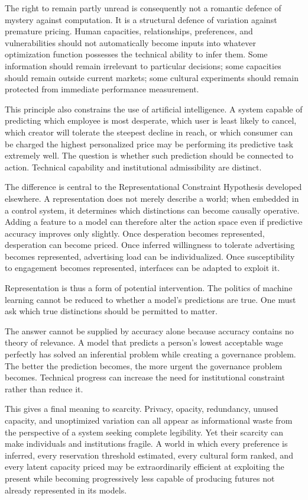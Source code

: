 \documentclass[11pt]{article}
\begin{document}
The right to remain partly unread is consequently not a romantic defence of mystery against computation. It is a structural defence of variation against premature pricing. Human capacities, relationships, preferences, and vulnerabilities should not automatically become inputs into whatever optimization function possesses the technical ability to infer them. Some information should remain irrelevant to particular decisions; some capacities should remain outside current markets; some cultural experiments should remain protected from immediate performance measurement.

This principle also constrains the use of artificial intelligence. A system capable of predicting which employee is most desperate, which user is least likely to cancel, which creator will tolerate the steepest decline in reach, or which consumer can be charged the highest personalized price may be performing its predictive task extremely well. The question is whether such prediction should be connected to action. Technical capability and institutional admissibility are distinct.

The difference is central to the Representational Constraint Hypothesis developed elsewhere. A representation does not merely describe a world; when embedded in a control system, it determines which distinctions can become causally operative. Adding a feature to a model can therefore alter the action space even if predictive accuracy improves only slightly. Once desperation becomes represented, desperation can become priced. Once inferred willingness to tolerate advertising becomes represented, advertising load can be individualized. Once susceptibility to engagement becomes represented, interfaces can be adapted to exploit it.

Representation is thus a form of potential intervention. The politics of machine learning cannot be reduced to whether a model's predictions are true. One must ask which true distinctions should be permitted to matter.

The answer cannot be supplied by accuracy alone because accuracy contains no theory of relevance. A model that predicts a person's lowest acceptable wage perfectly has solved an inferential problem while creating a governance problem. The better the prediction becomes, the more urgent the governance problem becomes. Technical progress can increase the need for institutional constraint rather than reduce it.

This gives a final meaning to scarcity. Privacy, opacity, redundancy, unused capacity, and unoptimized variation can all appear as informational waste from the perspective of a system seeking complete legibility. Yet their scarcity can make individuals and institutions fragile. A world in which every preference is inferred, every reservation threshold estimated, every cultural form ranked, and every latent capacity priced may be extraordinarily efficient at exploiting the present while becoming progressively less capable of producing futures not already represented in its models.
\end{document}
